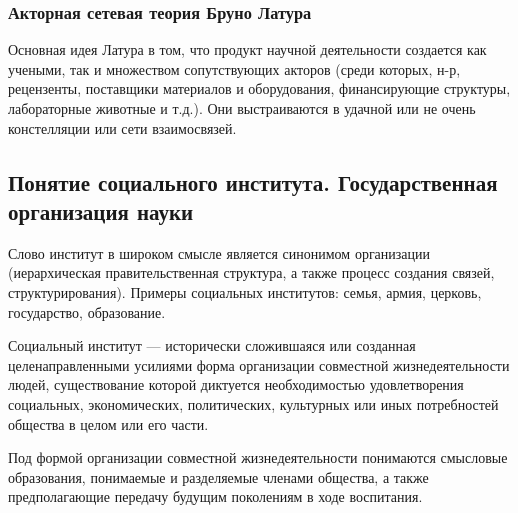 \subsubsection{Акторная сетевая теория Бруно Латура}

Основная идея Латура в том, что продукт научной деятельности создается как учеными, 
так и множеством сопутствующих акторов (среди которых, н-р, рецензенты, поставщики 
материалов и оборудования, финансирующие структуры, лабораторные животные и т.д.).
Они выстраиваются в удачной или не очень констелляции или сети взаимосвязей. 

\subsection{Понятие социального института. Государственная организация науки} 

Слово институт в широком смысле является синонимом организации (иерархическая правительственная структура, а также процесс создания связей, структурирования).
Примеры социальных институтов: семья, армия, церковь, государство,
образование.

Социальный институт --- исторически сложившаяся или созданная
целенаправленными усилиями форма организации совместной жизнедеятельности людей,
существование которой диктуется необходимостью удовлетворения социальных,
экономических, политических, культурных или иных потребностей общества в целом
или его части.

Под формой организации совместной жизнедеятельности понимаются смысловые
образования, понимаемые и разделяемые членами общества, а также предполагающие
передачу будущим поколениям в ходе воспитания. 



